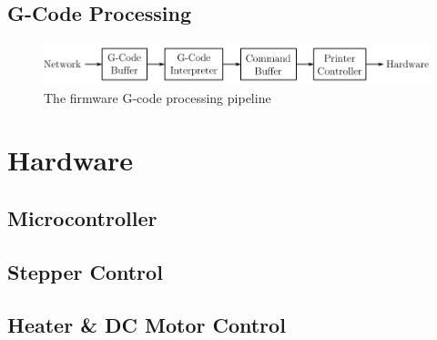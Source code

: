 		\subsection{G-Code Processing}
			
			\begin{figure}[here]
				\includegraphics[width=1\textwidth]{diagrams/firmwarePipeline.pdf}
				\caption{The firmware G-code processing pipeline}
				\label{fig:firmwarePipeline}
			\end{figure}
	
	\section{Hardware}
		
		\subsection{Microcontroller}
		
		\subsection{Stepper Control}
		
		\subsection{Heater \& DC Motor Control}
	

